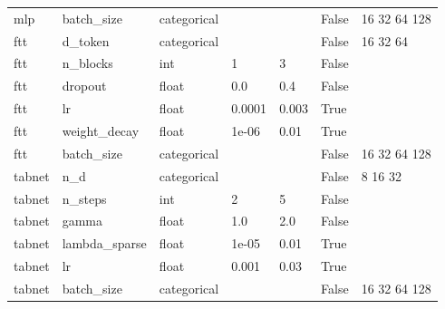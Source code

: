\begin{table}[t]
\begin{tabular}{lllllll}
mlp & batch\_size & categorical &  &  & False & 16 32 64 128 \\
ftt & d\_token & categorical &  &  & False & 16 32 64 \\
ftt & n\_blocks & int & 1 & 3 & False &  \\
ftt & dropout & float & 0.0 & 0.4 & False &  \\
ftt & lr & float & 0.0001 & 0.003 & True &  \\
ftt & weight\_decay & float & 1e-06 & 0.01 & True &  \\
ftt & batch\_size & categorical &  &  & False & 16 32 64 128 \\
tabnet & n\_d & categorical &  &  & False & 8 16 32 \\
tabnet & n\_steps & int & 2 & 5 & False &  \\
tabnet & gamma & float & 1.0 & 2.0 & False &  \\
tabnet & lambda\_sparse & float & 1e-05 & 0.01 & True &  \\
tabnet & lr & float & 0.001 & 0.03 & True &  \\
tabnet & batch\_size & categorical &  &  & False & 16 32 64 128 \\
\bottomrule
\end{tabular}
\end{table}
